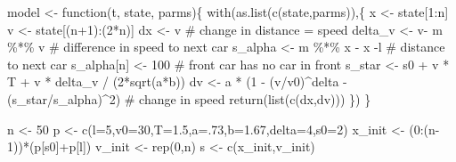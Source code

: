 \documentclass[
  a4paper,
  DIV=11,
  numbers=noendperiod,
  oneside]{scrreprt}
\newenvironment{Shaded}{}{}
\newcommand{\AttributeTok}[1]{\textcolor[rgb]{0.84,0.23,0.29}{#1}}
\newcommand{\CommentTok}[1]{\textcolor[rgb]{0.42,0.45,0.49}{#1}}
\newcommand{\ControlFlowTok}[1]{\textcolor[rgb]{0.84,0.23,0.29}{#1}}
\newcommand{\DecValTok}[1]{\textcolor[rgb]{0.00,0.36,0.77}{#1}}
\newcommand{\FloatTok}[1]{\textcolor[rgb]{0.00,0.36,0.77}{#1}}
\newcommand{\FunctionTok}[1]{\textcolor[rgb]{0.44,0.26,0.76}{#1}}
\newcommand{\NormalTok}[1]{\textcolor[rgb]{0.14,0.16,0.18}{#1}}
\newcommand{\OtherTok}[1]{\textcolor[rgb]{0.44,0.26,0.76}{#1}}
\newcommand{\SpecialCharTok}[1]{\textcolor[rgb]{0.00,0.36,0.77}{#1}}
\newcommand{\StringTok}[1]{\textcolor[rgb]{0.01,0.18,0.38}{#1}}
\begin{document}
\begin{Shaded}
\begin{Highlighting}[]
\NormalTok{model }\OtherTok{\textless{}{-}} \ControlFlowTok{function}\NormalTok{(t, state, parms)\{}
  \FunctionTok{with}\NormalTok{(}\FunctionTok{as.list}\NormalTok{(}\FunctionTok{c}\NormalTok{(state,parms)),\{}
\NormalTok{    x }\OtherTok{\textless{}{-}}\NormalTok{ state[}\DecValTok{1}\SpecialCharTok{:}\NormalTok{n]}
\NormalTok{    v }\OtherTok{\textless{}{-}}\NormalTok{ state[(n}\SpecialCharTok{+}\DecValTok{1}\NormalTok{)}\SpecialCharTok{:}\NormalTok{(}\DecValTok{2}\SpecialCharTok{*}\NormalTok{n)]}
\NormalTok{    dx }\OtherTok{\textless{}{-}}\NormalTok{  v }\CommentTok{\# change in distance = speed}
\NormalTok{    delta\_v }\OtherTok{\textless{}{-}}\NormalTok{ v}\SpecialCharTok{{-}}\NormalTok{ m }\SpecialCharTok{\%*\%}\NormalTok{ v }\CommentTok{\# difference in speed to next car}
\NormalTok{    s\_alpha }\OtherTok{\textless{}{-}}\NormalTok{ m }\SpecialCharTok{\%*\%}\NormalTok{ x }\SpecialCharTok{{-}}\NormalTok{ x }\SpecialCharTok{{-}}\NormalTok{l }\CommentTok{\#  distance to next car}
\NormalTok{    s\_alpha[n] }\OtherTok{\textless{}{-}} \DecValTok{100} \CommentTok{\# front car has no car in front}
\NormalTok{    s\_star }\OtherTok{\textless{}{-}}\NormalTok{ s0 }\SpecialCharTok{+}\NormalTok{ v }\SpecialCharTok{*}\NormalTok{ T }\SpecialCharTok{+}\NormalTok{ v }\SpecialCharTok{*}\NormalTok{ delta\_v }\SpecialCharTok{/}\NormalTok{ (}\DecValTok{2}\SpecialCharTok{*}\FunctionTok{sqrt}\NormalTok{(a}\SpecialCharTok{*}\NormalTok{b))}
\NormalTok{    dv }\OtherTok{\textless{}{-}}\NormalTok{ a }\SpecialCharTok{*}\NormalTok{ (}\DecValTok{1} \SpecialCharTok{{-}}\NormalTok{ (v}\SpecialCharTok{/}\NormalTok{v0)}\SpecialCharTok{\^{}}\NormalTok{delta }\SpecialCharTok{{-}}\NormalTok{ (s\_star}\SpecialCharTok{/}\NormalTok{s\_alpha)}\SpecialCharTok{\^{}}\DecValTok{2}\NormalTok{) }\CommentTok{\# change in speed}
    \FunctionTok{return}\NormalTok{(}\FunctionTok{list}\NormalTok{(}\FunctionTok{c}\NormalTok{(dx,dv)))}
\NormalTok{  \})}
\NormalTok{\}}

\NormalTok{n }\OtherTok{\textless{}{-}} \DecValTok{50}
\NormalTok{p }\OtherTok{\textless{}{-}} \FunctionTok{c}\NormalTok{(}\AttributeTok{l=}\DecValTok{5}\NormalTok{,}\AttributeTok{v0=}\DecValTok{30}\NormalTok{,}\AttributeTok{T=}\FloatTok{1.5}\NormalTok{,}\AttributeTok{a=}\NormalTok{.}\DecValTok{73}\NormalTok{,}\AttributeTok{b=}\FloatTok{1.67}\NormalTok{,}\AttributeTok{delta=}\DecValTok{4}\NormalTok{,}\AttributeTok{s0=}\DecValTok{2}\NormalTok{)}
\NormalTok{x\_init }\OtherTok{\textless{}{-}}\NormalTok{ (}\DecValTok{0}\SpecialCharTok{:}\NormalTok{(n}\DecValTok{{-}1}\NormalTok{))}\SpecialCharTok{*}\NormalTok{(p[}\StringTok{\textquotesingle{}s0\textquotesingle{}}\NormalTok{]}\SpecialCharTok{+}\NormalTok{p[}\StringTok{\textquotesingle{}l\textquotesingle{}}\NormalTok{])}
\NormalTok{v\_init }\OtherTok{\textless{}{-}} \FunctionTok{rep}\NormalTok{(}\DecValTok{0}\NormalTok{,n)}
\NormalTok{s }\OtherTok{\textless{}{-}} \FunctionTok{c}\NormalTok{(x\_init,v\_init)}


\end{Highlighting}
\end{Shaded}
\end{document}
